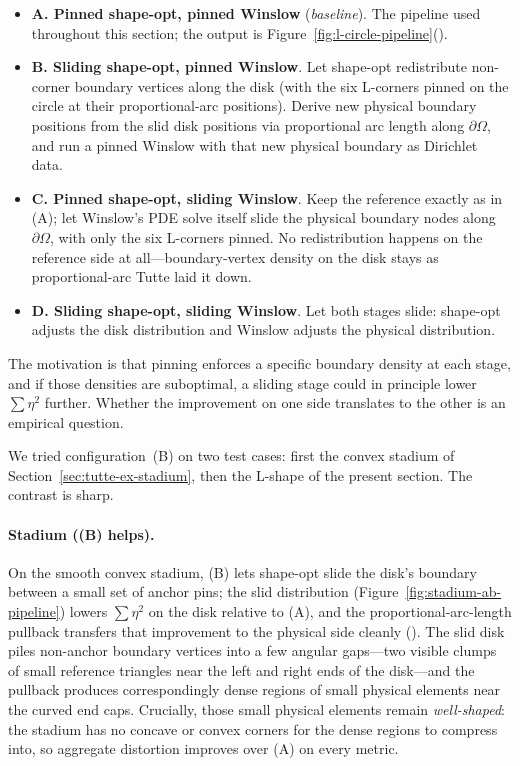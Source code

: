 \documentclass[11pt]{article}
\begin{document}
\begin{itemize}
  \item \textbf{A. Pinned shape-opt, pinned Winslow}
    (\emph{baseline}). The pipeline used throughout this section;
    the output is
    Figure~\ref{fig:l-circle-pipeline}().
  \item \textbf{B. Sliding shape-opt, pinned Winslow}. Let
    shape-opt redistribute non-corner boundary vertices along the
    disk (with the six L-corners pinned on the circle at their
    proportional-arc positions). Derive new physical boundary
    positions from the slid disk positions via proportional arc
    length along $\partial \Omega$, and run a pinned Winslow with
    that new physical boundary as Dirichlet data.
  \item \textbf{C. Pinned shape-opt, sliding Winslow}. Keep the
    reference exactly as in (A); let Winslow's PDE solve itself
    slide the physical boundary nodes along $\partial \Omega$,
    with only the six L-corners pinned. No redistribution happens
    on the reference side at all---boundary-vertex density on the
    disk stays as proportional-arc Tutte laid it down.
  \item \textbf{D. Sliding shape-opt, sliding Winslow}. Let both
    stages slide: shape-opt adjusts the disk distribution and
    Winslow adjusts the physical distribution.
\end{itemize}

The motivation is that pinning enforces a specific boundary
density at each stage, and if those densities are suboptimal,
a sliding stage could in principle lower $\sum \eta^2$ further.
Whether the improvement on one side translates to the other is
an empirical question.

\medskip
We tried configuration~(B) on two test cases: first the convex
stadium of Section~\ref{sec:tutte-ex-stadium}, then the L-shape
of the present section. The contrast is sharp.

\paragraph{Stadium ((B) helps).}
On the smooth convex stadium, (B) lets shape-opt slide the
disk's boundary between a small set of anchor pins; the slid
distribution
(Figure~\ref{fig:stadium-ab-pipeline})
lowers $\sum \eta^2$ on the disk relative to (A), and the
proportional-arc-length pullback transfers that improvement to
the physical side cleanly
(). The slid disk piles
non-anchor boundary vertices into a few angular gaps---two
visible clumps of small reference triangles near the left and
right ends of the disk---and the pullback produces
correspondingly dense regions of small physical elements near
the curved end caps. Crucially, those small physical elements
remain \emph{well-shaped}: the stadium has no concave or convex
corners for the dense regions to compress into, so aggregate
distortion improves over (A) on every metric.
\end{document}
